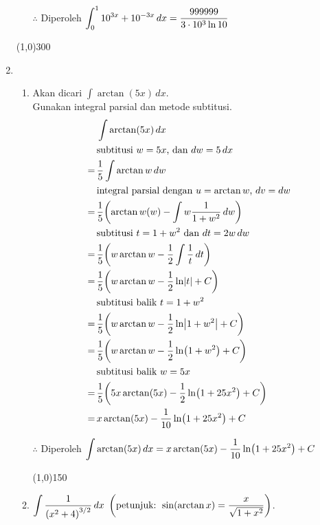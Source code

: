 \begin{enumerate}[leftmargin=*, label={\arabic*}.]
\begin{enumerate}[label={\alph*}.]
    $\therefore$ Diperoleh $\ds\int_{0}^{1} 10^{3x}+10^{-3x}\,dx 
    = \frac{999999}{3\cdot10^{3}\ln10}$
\end{enumerate}
\begin{center}
    \line(1,0){300}
\end{center}
\item 
\begin{enumerate}[label={\alph*}.]
    \item Akan dicari $\int \arctan(5x)\,dx$.\\
    Gunakan integral parsial dan metode subtitusi.\\
    \begin{align*}
        &\int \arctan(5x)\,dx\\
        &\text{subtitusi $w=5x$, dan $dw=5\,dx$}\\
        =\,&\frac{1}{5}\int\arctan w\,dw\\
        &\text{integral parsial dengan $u = \arctan w$, $dv = dw$}\\
        =\,&\frac{1}{5}\brk*{\arctan w(w)-\int w \frac{1}{1+w^{2}}\,dw}\\
        &\text{subtitusi $t = 1+w^{2}$ dan $dt=2w\,dw$}\\
        =\,&\frac{1}{5}\brk*{w\arctan w-\frac{1}{2}\int \frac{1}{t}\,dt}\\
        =\,&\frac{1}{5}\brk*{w\arctan w-\frac{1}{2}\ln\abs{t}+C}\\
        &\text{subtitusi balik $t=1+w^{2}$}\\
        =\,&\frac{1}{5}\brk*{w\arctan w-\frac{1}{2}\ln\abs*{1+w^{2}}+C}\\
        =\,&\frac{1}{5}\brk*{w\arctan w-\frac{1}{2}\ln\brk*{1+w^{2}}+C}\\
        &\text{subtitusi balik $w=5x$}\\
        =\,&\frac{1}{5}\brk*{5x\arctan(5x)-\frac{1}{2}\ln\brk*{1+25x^{2}}+C}\\
        =\,&x\arctan(5x)-\frac{1}{10}\ln\brk*{1+25x^{2}}+C
    \end{align*}

    $\therefore$ Diperoleh 
    $\ds \int \arctan(5x)\,dx = x\arctan(5x)-\frac{1}{10}\ln\brk*{1+25x^{2}}+C$
\begin{center}
    \line(1,0){150}
\end{center}
    \item $\ds \int \frac{1}{\brk*{x^{2}+4}^{3/2}}\,dx$ 
    $\ds\brk*{\text{petunjuk: } \sin(\arctan x) = \frac{x}{\sqrt{1+x^{2}}}}$.


\end{enumerate}
\end{enumerate}

